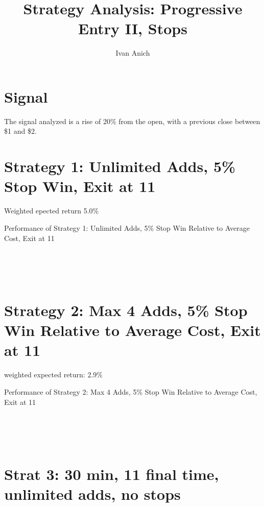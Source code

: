\documentclass{article}
\title{Strategy Analysis: Progressive Entry II, Stops}
\author{Ivan Anich}
\begin{document}
\maketitle

\section{Signal}

The signal analyzed is a rise of 20\% from the open, with a previous close between \$1 and \$2. 

\section{Strategy 1: Unlimited Adds, 5\% Stop Win, Exit at 11}

Weighted epected return 5.0\%
\begin{table}
\caption{Performance of Strategy 1: Unlimited Adds, 5\% Stop Win Relative to Average Cost, Exit at 11}
\\[2ex]


\\[2ex]


\\[2ex]

\label{tab_strat_1}
\end{table}

\section{Strategy 2: Max 4 Adds, 5\% Stop Win Relative to Average Cost, Exit at 11} 

weighted expected return: 2.9\%

\begin{table}
\caption{Performance of Strategy 2: Max 4 Adds, 5\% Stop Win Relative to Average Cost, Exit at 11}
\\[2ex]


\\[2ex]


\\[2ex]

\label{tab_strat_2}
\end{table}

\section{Strat 3: 30 min, 11 final time, unlimited adds, no stops}
\end{document}
